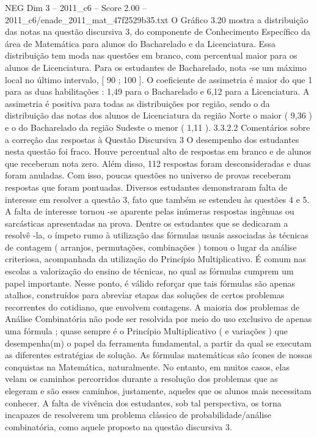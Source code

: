 \begin{textsample}{NEG Dim 3 – 2011\_c6 – Score 2.00 – 2011\_c6/enade\_2011\_mat\_47f2529b35.txt}
O Gráfico 3.20 mostra a distribuição das notas na questão discursiva 3, do componente de Conhecimento Específico da área de Matemática para alunos do Bacharelado e da Licenciatura.
Essa distribuição tem moda nas questões em branco, com percentual maior para os alunos de Licenciatura.
Para os estudantes de Bacharelado, nota -se um máximo local no último intervalo, [ 90 ; 100 ].
O coeficiente de assimetria é maior do que 1 para as duas habilitações : 1,49 para o Bacharelado e 6,12 para a Licenciatura.
A assimetria é positiva para todas as distribuições por região, sendo o da distribuição das notas dos alunos de Licenciatura da região Norte o maior ( 9,36 ) e o do Bacharelado da região Sudeste o menor ( 1,11 ). 3.3.2.2 Comentários sobre a correção das respostas à Questão Discursiva 3 O desempenho dos estudantes nesta questão foi fraco.
Houve percentual alto de respostas em branco e de alunos que receberam nota zero.
Além disso, 112 respostas foram desconsideradas e duas foram anuladas.
Com isso, poucas questões no universo de provas receberam respostas que foram pontuadas.
Diversos estudantes demonstraram falta de interesse em resolver a questão 3, fato que também se estendeu às questões 4 e 5.
A falta de interesse tornou -se aparente pelas inúmeras respostas ingênuas ou sarcásticas apresentadas na prova.
Dentre os estudantes que se dedicaram a resolvê -la, o ímpeto rumo à utilização das fórmulas usuais associadas às técnicas de contagem ( arranjos, permutações, combinações ) tomou o lugar da análise criteriosa, acompanhada da utilização do Princípio Multiplicativo.
É comum nas escolas a valorização do ensino de técnicas, no qual as fórmulas cumprem um papel importante.
Nesse ponto, é válido reforçar que tais fórmulas são apenas atalhos, construídos para abreviar etapas das soluções de certos problemas recorrentes do cotidiano, que envolvem contagens.
A maioria dos problemas de Análise Combinatória não pode ser resolvida por meio do uso exclusivo de apenas uma fórmula ; quase sempre é o Princípio Multiplicativo ( e variações ) que desempenha(m) o papel da ferramenta fundamental, a partir da qual se executam as diferentes estratégias de solução.
As fórmulas matemáticas são ícones de nossas conquistas na Matemática, naturalmente.
No entanto, em muitos casos, elas velam os caminhos percorridos durante a resolução dos problemas que as elegeram e são esses caminhos, justamente, aqueles que os alunos mais necessitam conhecer.
A falta de vivência dos estudantes, sob tal perspectiva, os torna incapazes de resolverem um problema clássico de probabilidade/análise combinatória, como aquele proposto na questão discursiva 3.

\end{textsample}
